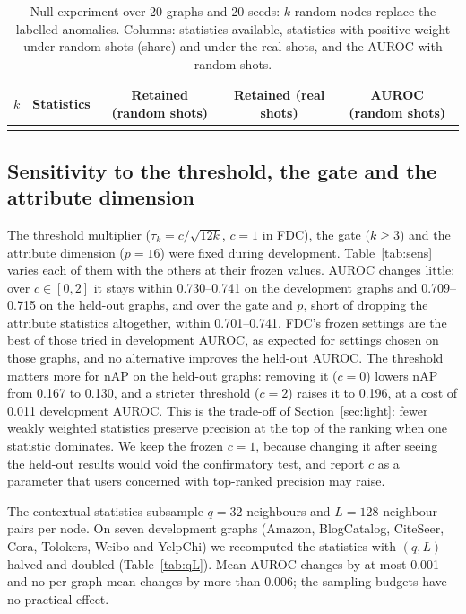 \documentclass[pdflatex,sn-mathphys-ay]{sn-jnl}
\theoremstyle{plain}
\theoremstyle{remark}
\begin{document}
\begin{table}[!ht]
\caption{Null experiment over 20 graphs and 20 seeds: $k$ random nodes replace the labelled anomalies. Columns: statistics available, statistics with positive weight under random shots (share) and under the real shots, and the AUROC with random shots.}
\label{tab:null}
\footnotesize
\begin{tabular*}{\textwidth}{@{\extracolsep{\fill}}ccccc@{}}
\toprule
$k$ & Statistics & Retained (random shots) & Retained (real shots) & AUROC (random shots) \\
\midrule

\botrule
\end{tabular*}
\end{table}

\subsection{Sensitivity to the threshold, the gate and the attribute dimension}\label{sec:sens}

The threshold multiplier ($\tau_k=c/\sqrt{12k}$, $c=1$ in FDC), the gate ($k\ge3$) and the attribute dimension ($p=16$) were fixed during development. Table~\ref{tab:sens} varies each of them with the others at their frozen values. AUROC changes little: over $c\in[0,2]$ it stays within 0.730--0.741 on the development graphs and 0.709--0.715 on the held-out graphs, and over the gate and $p$, short of dropping the attribute statistics altogether, within 0.701--0.741. FDC's frozen settings are the best of those tried in development AUROC, as expected for settings chosen on those graphs, and no alternative improves the held-out AUROC. The threshold matters more for nAP on the held-out graphs: removing it ($c=0$) lowers nAP from 0.167 to 0.130, and a stricter threshold ($c=2$) raises it to 0.196, at a cost of 0.011 development AUROC. This is the trade-off of Section~\ref{sec:light}: fewer weakly weighted statistics preserve precision at the top of the ranking when one statistic dominates. We keep the frozen $c=1$, because changing it after seeing the held-out results would void the confirmatory test, and report $c$ as a parameter that users concerned with top-ranked precision may raise.

The contextual statistics subsample $q=32$ neighbours and $L=128$ neighbour pairs per node. On seven development graphs (Amazon, BlogCatalog, CiteSeer, Cora, Tolokers, Weibo and YelpChi) we recomputed the statistics with $(q,L)$ halved and doubled (Table~\ref{tab:qL}). Mean AUROC changes by at most 0.001 and no per-graph mean changes by more than 0.006; the sampling budgets have no practical effect.
\end{document}
